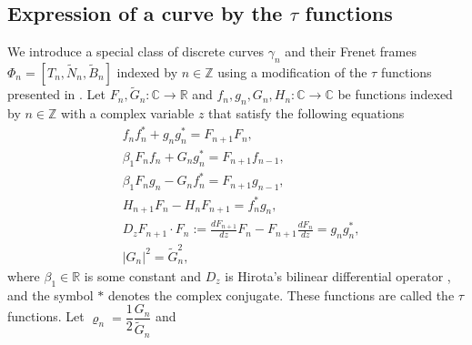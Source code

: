 \documentclass[10pt,leqno]{amsart}
\newcommand{\Z}{\mathbb{Z}}
\numberwithin{equation}{section}
\begin{document}
\subsection{Expression of a curve by the \texorpdfstring{$\tau$}{tau} functions}\label{sec:tau-representation}
We introduce a special class of discrete curves $\gamma_n$ and their Frenet frames
$\Phi_{n}=[T_{n}, \widetilde{N}_{n}, \widetilde{B}_{n}]$
indexed by $n\in \Z$ using a modification of the $\tau$ functions presented in \cite{HIKMO:DLIE}.
Let $F_n,\widetilde{G}_n:\mathbb{C}\to \mathbb{R}$ 
and $f_n, g_n, G_n, H_n:\mathbb{C}\to \mathbb{C}$
be functions indexed by $n\in \Z$ 
with a complex variable $z$ that satisfy the following equations
\begin{align}
&f_{n}f_{n}^*+g_{n}g_{n}^*=F_{n+1}F_{n} \label{i1},\\
&\beta_{1} F_{n}f_{n}+G_{n}g_{n}^*=F_{n+1}f_{n-1} \label{i2},\\
&\beta_{1} F_{n}g_{n}-G_{n}f_{n}^*=F_{n+1}g_{n-1} \label{i3},\\
&H_{n+1}F_{n}-H_{n}F_{n+1}=f_{n}^*g_{n} \label{i4},\\
&D_zF_{n+1}\cdot F_{n}:=\frac{dF_{n+1}}{dz}F_{n}-F_{n+1}\frac{dF_{n}}{dz}=g_{n}g_{n}^* \label{i5},\\
&\left|G_{n}\right|^{2}=\widetilde{G}_{n}^{2},\label{i6}
\end{align}
where $\beta_{1}\in\mathbb{R}$ is some constant and $D_z$ is Hirota's bilinear differential operator \cite{hirota_2004}, and the symbol $*$ denotes the complex conjugate.
These functions are called the $\tau$ functions.
Let $\varrho_{n}=\dfrac{1}{2}\dfrac{G_{n}}{\widetilde{G}_{n}}$ and
\end{document}

